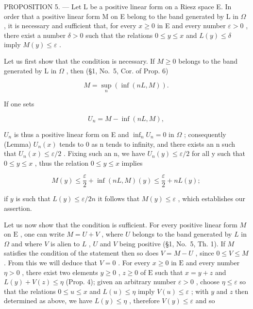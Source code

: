 PROPOSITION 5. --- Let L be a positive linear form on a Riesz space E. In order that a positive linear form M on E belong to the band generated by L in \(\Omega\) , it is necessary and sufficient that, for every \(x \geqslant 0\) in E and every number \(\varepsilon > 0\) , there exist a number \(\delta > 0\) such that the relations \(0 \leqslant y \leqslant x\) and \(L(y) \leqslant \delta\) imply \(M(y) \leqslant \varepsilon\) .

Let us first show that the condition is necessary. If \(M \geqslant 0\) belongs to the band generated by L in \(\Omega\) , then (§1, No.~5, Cor. of Prop. 6)

\[
M = \sup _ {n} \left(\inf (n L, M)\right).
\]

If one sets

\[
U _ {n} = M - \inf (n L, M),
\]

\(U_{n}\) is thus a positive linear form on E and \(\inf_{n} U_{n} = 0\) in \(\Omega\) ; consequently (Lemma) \(U_{n}(x)\) tends to 0 as n tends to infinity, and there exists an n such that \(U_{n}(x) \leqslant \varepsilon / 2\) . Fixing such an n, we have \(U_{n}(y) \leqslant \varepsilon / 2\) for all y such that \(0 \leqslant y \leqslant x\) , thus the relation \(0 \leqslant y \leqslant x\) implies

\[
M (y) \leqslant \frac {\varepsilon}{2} + \inf (n L, M) (y) \leqslant \frac {\varepsilon}{2} + n L (y);
\]

if \(y\) is such that \(L(y) \leqslant \varepsilon / 2n\) it follows that \(M(y) \leqslant \varepsilon\) , which establishes our assertion.

Let us now show that the condition is sufficient. For every positive linear form \(M\) on \(\mathrm{E}\) , one can write \(M = U + V\) , where \(U\) belongs to the band generated by \(L\) in \(\Omega\) and where \(V\) is alien to \(L\) , \(U\) and \(V\) being positive (§1, No.~5, Th. 1). If \(M\) satisfies the condition of the statement then so does \(V = M - U\) , since \(0 \leqslant V \leqslant M\) . From this we will deduce that \(V = 0\) . For every \(x \geqslant 0\) in \(\mathrm{E}\) and every number \(\eta > 0\) , there exist two elements \(y \geqslant 0\) , \(z \geqslant 0\) of \(\mathrm{E}\) such that \(x = y + z\) and \(L(y) + V(z) \leqslant \eta\) (Prop. 4); given an arbitrary number \(\varepsilon > 0\) , choose \(\eta \leqslant \varepsilon\) so that the relations \(0 \leqslant u \leqslant x\) and \(L(u) \leqslant \eta\) imply \(V(u) \leqslant \varepsilon\) ; with \(y\) and \(z\) then determined as above, we have \(L(y) \leqslant \eta\) , therefore \(V(y) \leqslant \varepsilon\) and so

